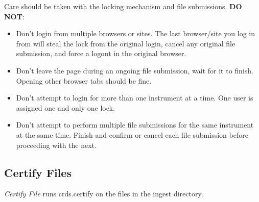 \documentclass[letterpaper,10pt,english]{sphinxmanual}
\begin{document}
Care should be taken with the locking mechanism and file submissions.  \textbf{DO NOT}:
\begin{itemize}
\item {} 
Don't login from multiple browsers or sites.   The last browser/site you log in from will steal the
lock from the original login, cancel any original file submission,  and force a logout in the original browser.

\item {} 
Don't leave the page during an ongoing file submission,  wait for it to finish.   Opening other browser
tabs should be fine.

\item {} 
Don't attempt to login for more than one instrument at a time.  One user is assigned one and only one lock.

\item {} 
Don't attempt to perform multiple file submissions for the same instrument at the same time.  Finish
and confirm or cancel each file submission before proceeding with the next.

\end{itemize}


\subsection{Certify Files}
\label{web_site_use:certify-files}
\emph{Certify File} runs crds.certify on the files in the ingest directory.
\begin{figure}[htbp]
\centering

\end{figure}
\end{document}
